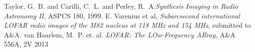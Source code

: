 \documentclass[twoside]{report}
\begin{document}



\begin{thebibliography}{1}
 {Taylor}, G.~B. and {Carilli}, C.~L. and {Perley}, R.~A.{\em Synthesis Imaging in Radio Astronomy II}, ASPCS 180, 1999.
 E. Varenius et al, {\em Subarcsecond international LOFAR radio images of the M82 nucleus at 118 MHz and 154 MHz}, submitted to A\&A.
 {van Haarlem}, M.~P.  et. al. {\em LOFAR: The LOw-Frequency ARray}, A\&A 556A, 2V 2013
\end{thebibliography}
\end{document}
